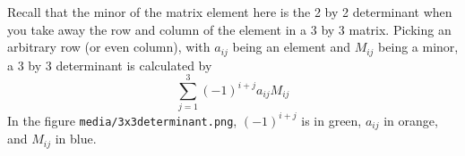 \documentclass[11pt]{article}
\theoremstyle{definition}
\begin{document}
Recall that the minor of the matrix element here is the 2 by 2 determinant when you take away the row and column of the element in a 3 by 3 matrix.  Picking an arbitrary row (or even column), with $a_{ij}$ being an element and $M_{ij}$ being a minor, a 3 by 3 determinant is calculated by 
\[ \sum_{j=1}^{3} (-1)^{i+j} a_{ij} M_{ij} \]
In the figure \texttt{media/3x3determinant.png}, $(-1)^{i+j}$ is in green, $a_{ij}$ in orange, and $M_{ij}$ in blue.






\end{document}
